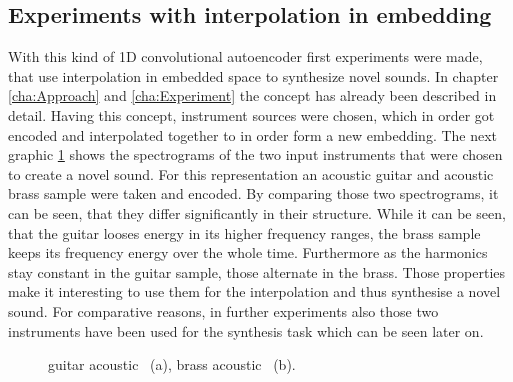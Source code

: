 \subsection{Experiments with interpolation in embedding}
With this kind of 1D convolutional autoencoder first experiments were made, that use interpolation in embedded space to synthesize novel sounds. In chapter \ref{cha:Approach} and \ref{cha:Experiment} the concept has already been described in detail. Having this concept, instrument sources were chosen, which in order got encoded and interpolated together to in order form a new embedding. The next graphic \ref{fig:res_1D_input_interpolation} shows the spectrograms of the two input instruments that were chosen to create a novel sound. For this representation an acoustic guitar and acoustic brass sample were taken and encoded. By comparing those two spectrograms, it can be seen, that they differ significantly in their structure. While it can be seen, that the guitar looses energy in its higher frequency ranges, the brass sample keeps its frequency energy over the whole time. Furthermore as the harmonics stay constant in the guitar sample, those alternate in the brass. Those properties make it interesting to use them for the interpolation and thus synthesise a novel sound. For comparative reasons, in further experiments also those two instruments have been used for the synthesis task which can be seen later on.

\begin{figure}[htb!]
    \centering
    \caption{guitar acoustic ~(a), brass acoustic ~(b).}
    \label{fig:res_1D_input_interpolation}
\end{figure}

